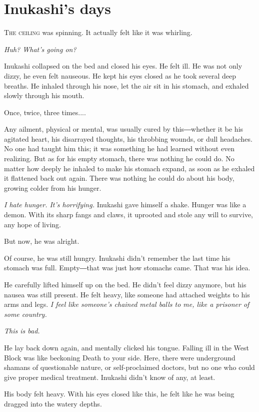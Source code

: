 
\chapter{Inukashi's days}

\lettrine{T}{he ceiling} was spinning. It actually felt like it was whirling.

\emph{Huh? What's going on?}

Inukashi collapsed on the bed and closed his eyes. He felt ill. He was
not only dizzy, he even felt nauseous. He kept his eyes closed as he
took several deep breaths. He inhaled through his nose, let the air sit
in his stomach, and exhaled slowly through his mouth.

Once, twice, three times....

Any ailment, physical or mental, was usually cured by this―whether it be
his agitated heart, his disarrayed thoughts, his throbbing wounds, or
dull headaches. No one had taught him this; it was something he had
learned without even realizing. But as for his empty stomach, there was
nothing he could do. No matter how deeply he inhaled to make his stomach
expand, as soon as he exhaled it flattened back out again. There was
nothing he could do about his body, growing colder from his hunger.

\emph{I hate hunger. It's horrifying.} Inukashi gave himself a shake. Hunger
was like a demon. With its sharp fangs and claws, it uprooted and stole
any will to survive, any hope of living.

But now, he was alright.

Of course, he was still hungry. Inukashi didn't remember the last time
his stomach was full. Empty―that was just how stomachs came. That was
his idea.

He carefully lifted himself up on the bed. He didn't feel dizzy anymore,
but his nausea was still present. He felt heavy, like someone had
attached weights to his arms and legs. \emph{I feel like someone's chained
metal balls to me, like a prisoner of some country.}

\emph{This is bad.}

He lay back down again, and mentally clicked his tongue. Falling ill in
the West Block was like beckoning Death to your side. Here, there were
underground shamans of questionable nature, or self-proclaimed doctors,
but no one who could give proper medical treatment. Inukashi didn't know
of any, at least.

His body felt heavy. With his eyes closed like this, he felt like he was
being dragged into the watery depths.

